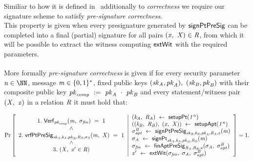 \begin{definition}\label{def:preSigCorrectness}
Similiar to how it is defined in~\cite{aumayr2020bitcoinchannels} additionally to \textit{correctness} we require our signature scheme to satisfy \textit{pre-signature correctness}. \\
This property is given when every presignature generated by $\mathsf{signPtPreSig}$ can be completed into a final (partial) signature for all pairs $(\mathit{x} ,~ \mathit{X}) \in \mathit{R}$, from which it will
be possible to extract the witness computing $\mathsf{extWit}$ with the required parameters.\\ \\
More formally \textit{pre-signature correctness} is given if for every security parameter $\varN \in \cnstNatural$, message $\mathit{m} \in \{0,1\}^{*}$, fixed public keys $(\mathit{sk}_{\mathit{A}}, \mathit{pk}_{\mathit{A}}) ,~ (\mathit{sk}_{\mathit{B}}, \mathit{pk}_{\mathit{B}})$
with their composite public key $\mathit{pk}_{\mathit{comp}} ~:=~ \mathit{pk}_{\mathit{A}} ~\cdot~ \mathit{pk}_{\mathit{B}}$ and every statement/witness pair $(\mathit{X} ,~ \mathit{x})$ in a relation $\mathit{R}$ it must hold that:
\begin{scriptsize}
    \[
        \Pr\left[
        \begin{array}{c}
            1.~\mathsf{Verf}_{\mathit{pk}_{\mathit{comp}}}(\mathit{m} ,~ \sigma_{\mathit{fin}}) ~=~ 1 \\
            ~\land~ \\
            2.~\mathsf{vrfPtPreSig}_{\mathit{sk}_{\mathit{A}},\mathit{\mathit{k}_{\mathit{A}}},\mathit{pk}_{\mathit{B}},\mathit{R}_{\mathit{B}},\sigma_{\mathit{B}}}(\mathit{m} ,~ \mathit{X}) ~=~ 1 \\
            ~\land~ \\
            3.~(\mathit{X} ,~ \mathit{x}' \in \mathit{R})
        \end{array}
        \middle\vert
        \begin{array}{l}
            (\mathit{\mathit{k}_{\mathit{A}}} ,~ \mathit{R}_{\mathit{A}}) ~\leftarrow~ \mathsf{setupPt} (\mathit{1^n}) \\
            ((\mathit{\mathit{k}_{\mathit{B}}} ,~ \mathit{R}_{\mathit{B}}) ,~ (\mathit{x} ,~ \mathit{X})) ~\leftarrow~ \mathsf{setupApt}(\mathit{1^n}) \\
            \sigma^{\mathit{B}}_{\mathit{apt}} ~\leftarrow~ \mathsf{signPtPreSig}_{\mathit{sk}_{\mathit{B}},\mathit{\mathit{k}_{\mathit{B}}},\mathit{pk}_{\mathit{A}},\mathit{R}_{\mathit{A}},\mathit{x}}(\mathit{m}) \\
            \sigma_{\mathit{A}} ~\leftarrow~ \mathsf{signPt}_{\mathit{sk}_{\mathit{A}},\mathit{\mathit{k}_{\mathit{A}}},\mathit{pk}_{\mathit{B}},\mathit{R}_{\mathit{B}}}(\mathit{m}) \\
            \sigma_{\mathit{fin}} ~\leftarrow~ \mathsf{finAptPreSig}_{\mathit{R}_{\mathit{A}},\mathit{R}_{\mathit{B}},\mathit{x}}(\sigma_{\mathit{A}} ,~ \sigma^{\mathit{B}}_{\mathit{apt}}) \\
            \mathit{x}' ~\leftarrow~ \mathsf{extWit}(\sigma_{\mathit{fin}} ,~ \sigma_{\mathit{A}} ,~ \sigma^{\mathit{B}}_{\mathit{apt}})
        \end{array}
        \right]=1.
    \]
\end{scriptsize}
\end{definition}

